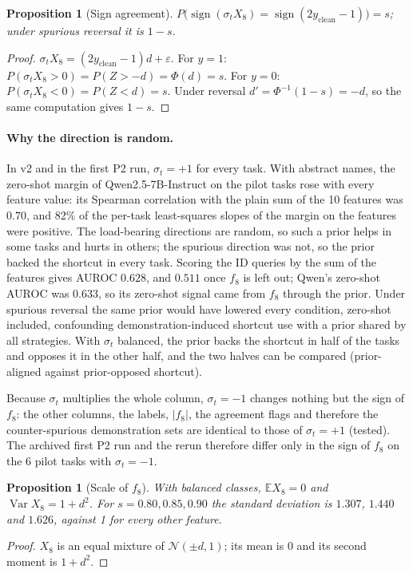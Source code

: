 \documentclass[11pt,a4paper]{article}
\newcommand{\1}{\mathbf{1}}
\newcommand{\E}{\mathbb{E}}
\DeclareMathOperator{\sign}{sign}
\DeclareMathOperator{\Var}{Var}
\theoremstyle{plain}
\newtheorem{proposition}[theorem]{Proposition}
\theoremstyle{definition}
\theoremstyle{remark}
\begin{document}
\begin{proposition}[Sign agreement]
\label{prop:agreement}
$P\big(\sign(\sigma_t X_8) = \sign(2y_{\mathrm{clean}}-1)\big) = s$; under
spurious reversal it is $1-s$.
\end{proposition}
\begin{proof}
$\sigma_t X_8 = (2y_{\mathrm{clean}}-1)d + \varepsilon$. For $y=1$:
$P(\sigma_t X_8 > 0) = P(Z > -d) = \Phi(d) = s$. For $y=0$:
$P(\sigma_t X_8 < 0) = P(Z < d) = s$. Under reversal
$d' = \Phi^{-1}(1-s) = -d$, so the same computation gives $1-s$.
\end{proof}

\paragraph{Why the direction is random.} In v2 and in the first P2 run,
$\sigma_t = +1$ for every task. With abstract names, the zero-shot margin of
Qwen2.5-7B-Instruct on the pilot tasks rose with every feature value: its
Spearman correlation with the plain sum of the 10 features was $0.70$, and
82\% of the per-task least-squares slopes of the margin on the features were
positive. The load-bearing directions are random, so such a prior helps in
some tasks and hurts in others; the spurious direction was not, so the prior
backed the shortcut in every task. Scoring the ID queries by the sum of the
features gives AUROC $0.628$, and $0.511$ once $f_8$ is left out; Qwen's
zero-shot AUROC was $0.633$, so its zero-shot signal came from $f_8$ through
the prior. Under spurious reversal the same prior would have lowered every
condition, zero-shot included, confounding demonstration-induced shortcut
use with a prior shared by all strategies. With $\sigma_t$ balanced, the
prior backs the shortcut in half of the tasks and opposes it in the other
half, and the two halves can be compared (prior-aligned against
prior-opposed shortcut).

Because $\sigma_t$ multiplies the whole column, $\sigma_t = -1$ changes
nothing but the sign of $f_8$: the other columns, the labels, $|f_8|$, the
agreement flags and therefore the counter-spurious demonstration sets are
identical to those of $\sigma_t = +1$ (tested). The archived first P2 run
and the rerun therefore differ only in the sign of $f_8$ on the 6 pilot
tasks with $\sigma_t = -1$.

\begin{proposition}[Scale of $f_8$]
With balanced classes, $\E X_8 = 0$ and $\Var X_8 = 1 + d^2$. For
$s = 0.80, 0.85, 0.90$ the standard deviation is $1.307$, $1.440$ and
$1.626$, against 1 for every other feature.
\end{proposition}
\begin{proof}
$X_8$ is an equal mixture of $\mathcal{N}(\pm d, 1)$; its mean is 0 and its
second moment is $1 + d^2$.
\end{proof}
\end{document}
